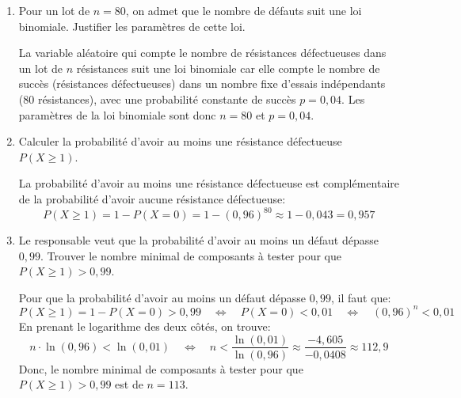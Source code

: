 \documentclass[11pt, a4paper]{report}
\begin{document}
\begin{enumerate}[resume]
    \item Pour un lot de $n = 80$, on admet que le nombre de défauts suit une loi binomiale. Justifier les paramètres de cette loi.
    \begin{blocvisible}[height=5]
        La variable aléatoire qui compte le nombre de résistances défectueuses dans un lot de $n$ résistances suit une loi binomiale car elle compte le nombre de succès (résistances défectueuses) dans un nombre fixe d'essais indépendants (80 résistances), avec une probabilité constante de succès $p = 0,04$. Les paramètres de la loi binomiale sont donc $n = 80$ et $p = 0,04$.
    \end{blocvisible}
    \item Calculer la probabilité d'avoir au moins une résistance défectueuse $P(X \geq 1)$.
    \begin{blocvisible}[height=3]
        La probabilité d'avoir au moins une résistance défectueuse est complémentaire de la probabilité d'avoir aucune résistance défectueuse:
        \[P(X \geq 1) = 1 - P(X = 0)= 1 - {(0,96)}^{80} \approx 1 - 0,043 = 0,957\]
    \end{blocvisible}


    \item Le responsable veut que la probabilité d'avoir au moins un défaut dépasse $0,99$. Trouver le nombre minimal de composants à tester pour que $P(X \geq 1) > 0,99$.
    \begin{blocvisible}[height=5]
        Pour que la probabilité d'avoir au moins un défaut dépasse $0,99$, il faut que:
        \[P(X \geq 1) = 1 - P(X = 0) > 0,99 \quad \Leftrightarrow \quad P(X = 0) < 0,01 \quad \Leftrightarrow \quad {(0,96)}^{n} < 0,01\]   
        En prenant le logarithme des deux côtés, on trouve:
        \[n \cdot \ln(0,96) < \ln(0,01) \quad \Leftrightarrow \quad n < \frac{\ln(0,01)}{\ln(0,96)} \approx \frac{-4,605}{-0,0408} \approx 112,9\]
        Donc, le nombre minimal de composants à tester pour que $P(X \geq 1) > 0,99$ est de $n = 113$.
    \end{blocvisible}
    \appelprof{}
\end{enumerate}
\end{document}
